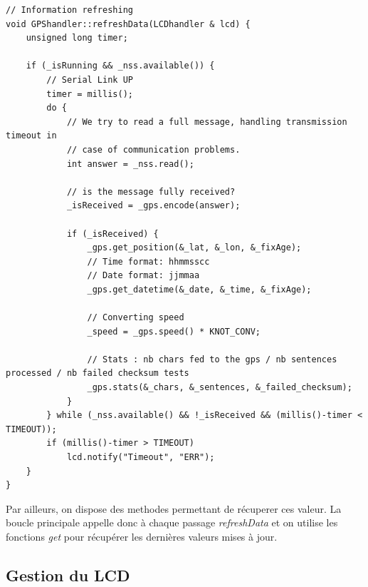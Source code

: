 \documentclass[a4paper,12pt,titlepage]{article}
\begin{document}
\begin{lstlisting}[caption={resfreshData},label={refreshData}]
// Information refreshing
void GPShandler::refreshData(LCDhandler & lcd) {
    unsigned long timer;

    if (_isRunning && _nss.available()) {
        // Serial Link UP
        timer = millis();
        do {
            // We try to read a full message, handling transmission timeout in
            // case of communication problems.
            int answer = _nss.read();

            // is the message fully received?
            _isReceived = _gps.encode(answer);

            if (_isReceived) {
                _gps.get_position(&_lat, &_lon, &_fixAge);
                // Time format: hhmmsscc
                // Date format: jjmmaa
                _gps.get_datetime(&_date, &_time, &_fixAge);

                // Converting speed
                _speed = _gps.speed() * KNOT_CONV;

                // Stats : nb chars fed to the gps / nb sentences processed / nb failed checksum tests
                _gps.stats(&_chars, &_sentences, &_failed_checksum);
            }
        } while (_nss.available() && !_isReceived && (millis()-timer < TIMEOUT));
        if (millis()-timer > TIMEOUT)
            lcd.notify("Timeout", "ERR");
    }
}
\end{lstlisting}

Par ailleurs, on dispose des methodes permettant de récuperer ces valeur. La boucle principale appelle donc à chaque passage \emph{refreshData} et on utilise les fonctions \emph{get}
pour récupérer les dernières valeurs mises à jour.

\subsection{Gestion du LCD}
\end{document}
